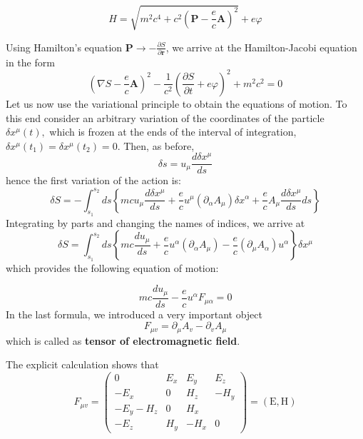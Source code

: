 \begin{qt}
    \begin{equation}
H=\sqrt{m^{2} c^{4}+c^{2}\left(\mathbf{P}-\frac{e}{c} \mathbf{A}\right)^{2}}+e \varphi
\end{equation}
\end{qt}
Using Hamilton's equation $\mathbf{P} \rightarrow-\frac{\partial S}{\partial \mathbf{r}}$, we arrive at the Hamilton-Jacobi equation in the form
\begin{equation}
\left(\nabla S-\frac{e}{c} \mathbf{A}\right)^{2}-\frac{1}{c^{2}}\left(\frac{\partial S}{\partial t}+e \varphi\right)^{2}+m^{2} c^{2}=0
\end{equation}
Let us now use the variational principle to obtain the equations of motion. To this end consider an arbitrary variation of the coordinates of the particle $\delta x^{\mu}(t),$ which is frozen at the ends of the interval of integration, $\delta x^{\mu}\left(t_{1}\right)=\delta x^{\mu}\left(t_{2}\right)=0 .$ Then, as before,
\begin{equation}
\delta s=u_{\mu} \frac{d \delta x^{\mu}}{d s}
\end{equation}
hence the first variation of the action is:
\begin{equation}
\delta S=-\int_{s_{1}}^{s_{2}} d s\left\{m c u_{\mu} \frac{d \delta x^{\mu}}{d s}+\frac{e}{c} u^{\mu} \left(\partial_{\alpha} A_{\mu}\right) \delta x^{\alpha}+\frac{e}{c} A_{\mu} \frac{d \delta x^{\mu}}{d s} d s\right\}
\end{equation}
Integrating by parts and changing the names of indices, we arrive at
\begin{equation}
\delta S=\int_{s_{1}}^{s_{2}} d s\left\{m c \frac{d u_{\mu}}{d s}+\frac{e}{c} u^{\alpha}\left(\partial_{\alpha} A_{\mu}\right)-\frac{e}{c}\left(\partial_{\mu} A_{\alpha}\right) u^{\alpha}\right\} \delta x^{\mu}
\end{equation}
which provides the following equation of motion:
\begin{qt}
    \begin{equation}
m c \frac{d u_{\mu}}{d s}-\frac{e}{c} u^{\alpha} F_{\mu \alpha}=0
\end{equation}
In the last formula, we introduced a very important object
\begin{equation}
F_{\mu v}=\partial_{\mu} A_{v}-\partial_{v} A_{\mu}
\end{equation}
which is called as \textbf{tensor of electromagnetic field}.
\end{qt}
The explicit calculation shows that
\begin{equation}
F_{\mu v}=\left(\begin{array}{cccc}
{0} & {E_{x}} & {E_{y}} & {E_{z}} \\
{-E_{x}} & {0} & {H_{z}} & {-H_{y}} \\
{-E_{y}-H_{z}} & {0} & {H_{x}} \\
{-E_{z}} & {H_{y}} & {-H_{x}} & {0}
\end{array}\right)=(\mathrm{E}, \mathrm{H})
\label{electromagnetic-tensor}
\end{equation}
